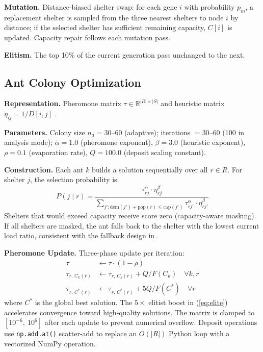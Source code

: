 \documentclass[journal]{IEEEtran}
\begin{document}
\textbf{Mutation.} Distance-biased shelter swap: for each gene $i$ with probability $p_m$,
a replacement shelter is sampled from the three nearest shelters to node $i$ by distance;
if the selected shelter has sufficient remaining capacity, $C[i]$ is updated. Capacity
repair follows each mutation pass.

\textbf{Elitism.} The top 10\% of the current generation pass unchanged to the next.

\subsection{Ant Colony Optimization}
\label{sec:aco}

\textbf{Representation.} Pheromone matrix $\tau \in \mathbb{R}^{|R| \times |S|}$ and
heuristic matrix $\eta_{ij} = 1/D[i,j]$ \cite{dorigo1996}.

\textbf{Parameters.} Colony size $n_a = 30$--$60$ (adaptive); iterations $= 30$--$60$
(100 in analysis mode); $\alpha = 1.0$ (pheromone exponent), $\beta = 3.0$ (heuristic
exponent), $\rho = 0.1$ (evaporation rate), $Q = 100.0$ (deposit scaling constant).

\textbf{Construction.} Each ant $k$ builds a solution sequentially over all $r \in R$.
For shelter $j$, the selection probability is:
\begin{equation}
  P(j \mid r) = \frac{\tau_{rj}^\alpha \cdot \eta_{rj}^\beta}
               {\sum_{j': \text{dem}(j') + \text{pop}(r) \leq \text{cap}(j')}
                \tau_{rj'}^\alpha \cdot \eta_{rj'}^\beta}
  \label{eq:aco_prob}
\end{equation}
Shelters that would exceed capacity receive score zero (capacity-aware masking). If all
shelters are masked, the ant falls back to the shelter with the lowest current load ratio,
consistent with the fallback design in \cite{xu2024aco}.

\textbf{Pheromone Update.} Three-phase update per iteration:
\begin{align}
  \tau &\leftarrow \tau \cdot (1 - \rho) \label{eq:evap} \\
  \tau_{r,\, C_k(r)} &\leftarrow \tau_{r,\, C_k(r)} + Q / F(C_k)
    \quad \forall k, r \label{eq:deposit} \\
  \tau_{r,\, C^*(r)} &\leftarrow \tau_{r,\, C^*(r)} + 5Q / F(C^*)
    \quad \forall r \label{eq:elite}
\end{align}
where $C^*$ is the global best solution. The $5\times$ elitist boost in (\ref{eq:elite})
accelerates convergence toward high-quality solutions. The matrix is clamped to
$[10^{-6},\ 10^6]$ after each update to prevent numerical overflow. Deposit operations use
\texttt{np.add.at()} scatter-add to replace an $O(|R|)$ Python loop with a vectorized
NumPy \cite{harris2020} operation.
\end{document}
